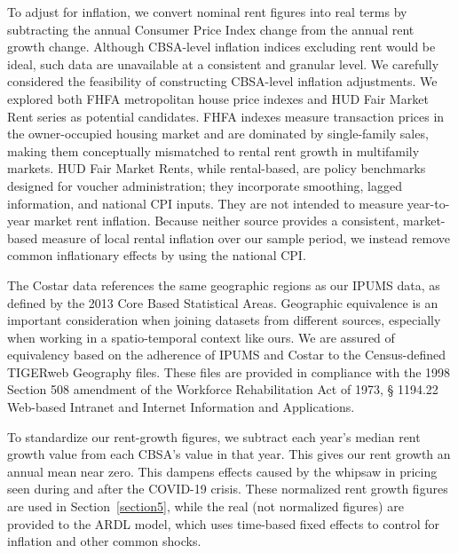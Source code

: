 \documentclass[pdflatex,sn-basic]{sn-jnl}%
\theoremstyle{thmstyleone}%
\theoremstyle{thmstyletwo}%
\theoremstyle{thmstylethree}%
\begin{document}
To adjust for inflation, we convert nominal rent figures into real terms by subtracting the annual Consumer Price Index change from the annual rent growth change. Although CBSA-level inflation indices excluding rent would be ideal, such data are unavailable at a consistent and granular level. We carefully considered the feasibility of constructing CBSA-level inflation adjustments. We explored both FHFA metropolitan house price indexes and HUD Fair Market Rent series as potential candidates. FHFA indexes measure transaction prices in the owner-occupied housing market and are dominated by single-family sales, making them conceptually mismatched to rental rent growth in multifamily markets. HUD Fair Market Rents, while rental-based, are policy benchmarks designed for voucher administration; they incorporate smoothing, lagged information, and national CPI inputs. They are not intended to measure year-to-year market rent inflation. Because neither source provides a consistent, market-based measure of local rental inflation over our sample period, we instead remove common inflationary effects by using the national CPI.

The Costar data references the same geographic regions as our IPUMS data, as defined by the 2013 Core Based Statistical Areas. Geographic equivalence is an important consideration when joining datasets from different sources, especially when working in a spatio-temporal context like ours. We are assured of equivalency based on the adherence of IPUMS and Costar to the Census-defined TIGERweb Geography files. These files are provided in compliance with the 1998 Section 508 amendment of the Workforce Rehabilitation Act of 1973, § 1194.22 Web-based Intranet and Internet Information and Applications.

To standardize our rent-growth figures, we subtract each year's median rent growth value from each CBSA's value in that year. This gives our rent growth an annual mean near zero. This dampens effects caused by the whipsaw in pricing seen during and after the COVID-19 crisis. These normalized rent growth figures are used in Section~\ref{section5}, while the real (not normalized figures) are provided to the ARDL model, which uses time-based fixed effects to control for inflation and other common shocks. 
\end{document}

